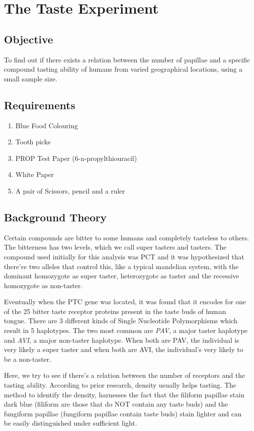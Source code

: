 \chapter{The Taste Experiment}
\section{Objective}
To find out if there exists a relation between the number of papillae and a specific compound tasting ability of humans from varied geographical locations, using a small sample size.

\section{Requirements}
	\begin{enumerate}
		\item Blue Food Colouring
		\item Tooth picks
		\item PROP Test Paper (6-n-propylthiouracil)
		\item White Paper
		\item A pair of Scissors, pencil and a ruler
	\end{enumerate}

\section{Background Theory}
	Certain compounds are bitter to some humans and completely tasteless to others. The bitterness has two levels, which we call super tasters and tasters. The compound used initially for this analysis was PCT and it was hypothesized that there're two alleles that control this, like a typical mandelian system, with the dominant homozygote as super taster, heterozygote as taster and the recessive homozygote as non-taster.
	\par
	Eventually when the PTC gene was located, it was found that it encodes for one of the 25 bitter taste receptor proteins present in the taste buds of human tongue. There are 3 different kinds of Single Nucleotide Polymorphisms which result in 5 haplotypes. The two most common are \emph{PAV}, a major taster haplotype and \emph{AVI}, a major non-taster haplotype. When both are PAV, the individual is very likely a super taster and when both are AVI, the individual's very likely to be a non-taster.
	\par
	Here, we try to see if there's a relation between the number of receptors and the tasting ability. According to prior research, density usually helps tasting. The method to identify the density, harnesses the fact that the filiform papillae stain dark blue (filiform are those that do NOT contain any taste buds) and the fungiform papillae (fungiform papillae contain taste buds) stain lighter and can be easily distinguished under sufficient light.

